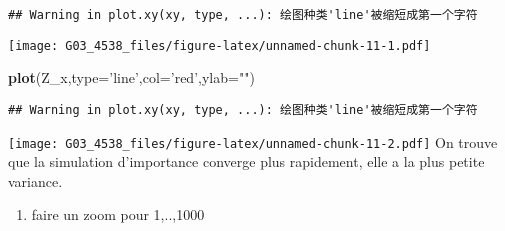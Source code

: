 \documentclass[]{article}
\newenvironment{Shaded}{\begin{snugshade}}{\end{snugshade}}
\newcommand{\KeywordTok}[1]{\textcolor[rgb]{0.13,0.29,0.53}{\textbf{#1}}}
\newcommand{\DataTypeTok}[1]{\textcolor[rgb]{0.13,0.29,0.53}{#1}}
\newcommand{\StringTok}[1]{\textcolor[rgb]{0.31,0.60,0.02}{#1}}
\newcommand{\NormalTok}[1]{#1}
\providecommand{\tightlist}{%
  \setlength{\itemsep}{0pt}\setlength{\parskip}{0pt}}
\begin{document}
\begin{verbatim}
## Warning in plot.xy(xy, type, ...): 绘图种类'line'被缩短成第一个字符
\end{verbatim}

\texttt{[image: G03\_4538\_files/figure-latex/unnamed-chunk-11-1.pdf]}

\begin{Shaded}
\begin{Highlighting}[]
\KeywordTok{plot}\NormalTok{(Z_x,}\DataTypeTok{type=}\StringTok{'line'}\NormalTok{,}\DataTypeTok{col=}\StringTok{'red'}\NormalTok{,}\DataTypeTok{ylab=}\StringTok{""}\NormalTok{)}
\end{Highlighting}
\end{Shaded}

\begin{verbatim}
## Warning in plot.xy(xy, type, ...): 绘图种类'line'被缩短成第一个字符
\end{verbatim}

\texttt{[image: G03\_4538\_files/figure-latex/unnamed-chunk-11-2.pdf]} On
trouve que la simulation d'importance converge plus rapidement, elle a
la plus petite variance.

\begin{enumerate}
\def\labelenumi{(\alph{enumi})}
\setcounter{enumi}{3}
\tightlist
\item
  faire un zoom pour 1,..,1000
\end{enumerate}
\end{document}
